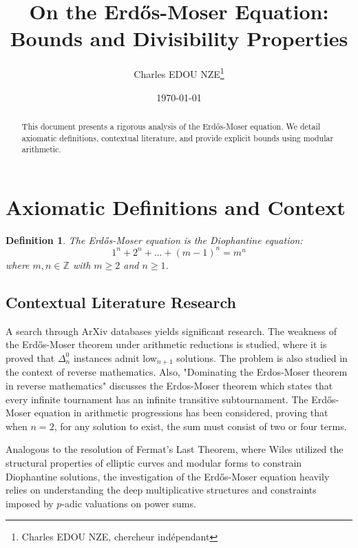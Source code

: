 \documentclass[12pt, a4paper]{article}
\title{On the Erd\H{o}s-Moser Equation: Bounds and Divisibility Properties}
\author{Charles EDOU NZE\thanks{Charles EDOU NZE, chercheur ind\'ependant}}
\date{\today}
\newtheorem{definition}[theorem]{Definition}
\begin{document}
\maketitle

\begin{abstract}
This document presents a rigorous analysis of the Erd\H{o}s-Moser equation. We detail axiomatic definitions, contextual literature, and provide explicit bounds using modular arithmetic.
\end{abstract}

\tableofcontents
\newpage

\section{Axiomatic Definitions and Context}
\begin{definition}
The Erd\H{o}s-Moser equation is the Diophantine equation:
\[ 1^n + 2^n + \dots + (m-1)^n = m^n \]
where $m, n \in \mathbb{Z}$ with $m \ge 2$ and $n \ge 1$.
\end{definition}

\subsection{Contextual Literature Research}
A search through ArXiv databases yields significant research. The weakness of the Erd\H{o}s-Moser theorem under arithmetic reductions is studied, where it is proved that $\Delta^0_n$ instances admit low$_{n+1}$ solutions. The problem is also studied in the context of reverse mathematics. Also, "Dominating the Erdos-Moser theorem in reverse mathematics" discusses the Erdos-Moser theorem which states that every infinite tournament has an infinite transitive subtournament. The Erd\H{o}s-Moser equation in arithmetic progressions has been considered, proving that when $n=2$, for any solution to exist, the sum must consist of two or four terms.

Analogous to the resolution of Fermat's Last Theorem, where Wiles utilized the structural properties of elliptic curves and modular forms to constrain Diophantine solutions, the investigation of the Erd\H{o}s-Moser equation heavily relies on understanding the deep multiplicative structures and constraints imposed by $p$-adic valuations on power sums.
\end{document}
